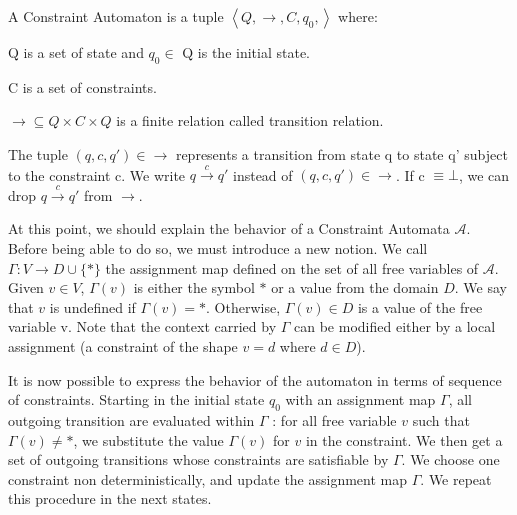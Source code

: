 
\begin{definition}
	A Constraint Automaton is a tuple $\left\langle Q, \rightarrow, C, q_{0}, \right\rangle$ where: 
	\begin{list}{-}{ }
		\item Q is a set of state and $q_0\in$ Q is the initial state.
		\item C is a set of constraints.
		\item ${\rightarrow} \subseteq Q \times C \times Q$ is a finite relation called transition relation.
	\end{list}
		The tuple $(q,c,q') \in \rightarrow$ represents a transition from state q to state q' subject to the constraint c. We write $q \xrightarrow{c} q'$ instead of $(q,c,q') \in \rightarrow$. If c $\equiv \bot$, we can drop $q \xrightarrow{c} q'$ from $\rightarrow$.
\end{definition}

At this point, we should explain the behavior of a Constraint Automata $\mathcal{A}$. Before being able to do so, we must introduce a new notion. We call $\Gamma : V \rightarrow D\cup\{*\}$ the assignment map defined on the set of all free variables of $\mathcal{A}$. Given $v \in V$, $\Gamma(v)$ is either the symbol $*$ or a value from the domain $D$. We say that $v$ is undefined if $\Gamma(v)=*$. Otherwise, $\Gamma(v) \in D$ is a value of the free variable v.
Note that the context carried by $\Gamma$ can be modified either by a local assignment (a constraint of the shape $v=d$ where $d\in D$).

It is now possible to express the behavior of the automaton in terms of sequence of constraints. Starting in the initial state $q_0$ with an assignment map $\Gamma$, all outgoing transition are evaluated within $\Gamma$ : for all free variable $v$ such that $\Gamma(v) \not = *$, we substitute the value $\Gamma(v)$ for $v$ in the constraint. We then get a set of outgoing transitions whose constraints are satisfiable by $\Gamma$. We choose one constraint non deterministically, and update the assignment map $\Gamma$. We repeat this procedure in the next states.



